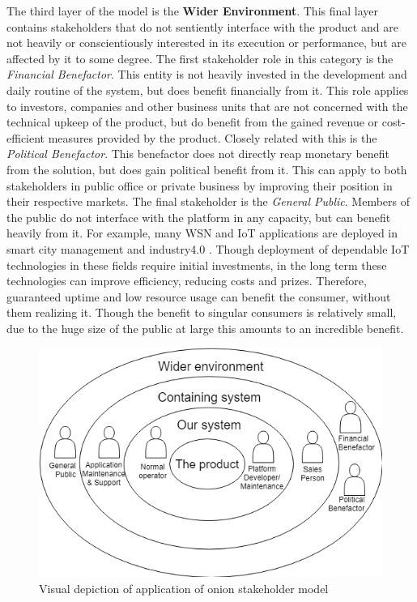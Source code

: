 The third layer of the model is the \textbf{Wider Environment}. This final layer contains stakeholders that do not sentiently interface with the product and are not heavily or conscientiously interested in its execution or performance, but are affected by it to some degree. The first stakeholder role in this category is the \emph{Financial Benefactor}. This entity is not heavily invested in the development and daily routine of the system, but does benefit financially from it. This role applies to investors, companies and other business units that are not concerned with the technical upkeep of the product, but do benefit from the gained revenue or cost-efficient measures provided by the product. Closely related with this is the \emph{Political Benefactor}. This benefactor does not directly reap monetary benefit from the solution, but does gain political benefit from it. This can apply to both stakeholders in public office or private business by improving their position in their respective markets. The final stakeholder is the \emph{General Public}. Members of the public do not interface with the platform in any capacity, but can benefit heavily from it. For example, many WSN and IoT applications are deployed in smart city management \cite{example_smart_city} and industry4.0 \cite{example_industry}. Though deployment of dependable IoT technologies in these fields require initial investments, in the long term these technologies can improve efficiency, reducing costs and prizes. Therefore, guaranteed uptime and low resource usage can benefit the consumer, without them realizing it. Though the benefit to singular consumers is relatively small, due to the huge size of the public at large this amounts to an incredible benefit.

\begin{figure}
\centering
\includegraphics[width=.7\textwidth]{resources/img/onion.png}
\caption{Visual depiction of application of onion stakeholder model}
\label{fig:onion}
\end{figure}


